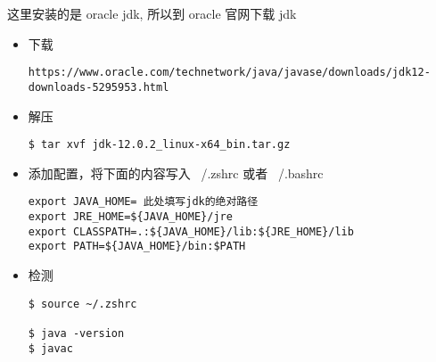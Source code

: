 \setlength\parindent{2em}这里安装的是 oracle jdk, 所以到 oracle 官网下载 jdk
\begin{itemize}
\item 下载
\begin{lstlisting}
https://www.oracle.com/technetwork/java/javase/downloads/jdk12-downloads-5295953.html
\end{lstlisting}


\item 解压
\begin{lstlisting}
$ tar xvf jdk-12.0.2_linux-x64_bin.tar.gz
\end{lstlisting}

\item 添加配置，将下面的内容写入 ~/.zshrc 或者 ~/.bashrc
\begin{lstlisting}
export JAVA_HOME= 此处填写jdk的绝对路径
export JRE_HOME=${JAVA_HOME}/jre
export CLASSPATH=.:${JAVA_HOME}/lib:${JRE_HOME}/lib
export PATH=${JAVA_HOME}/bin:$PATH
\end{lstlisting}

\item 检测 
\begin{lstlisting}
$ source ~/.zshrc 

$ java -version 
$ javac 
\end{lstlisting}
\end{itemize}
\newpage

